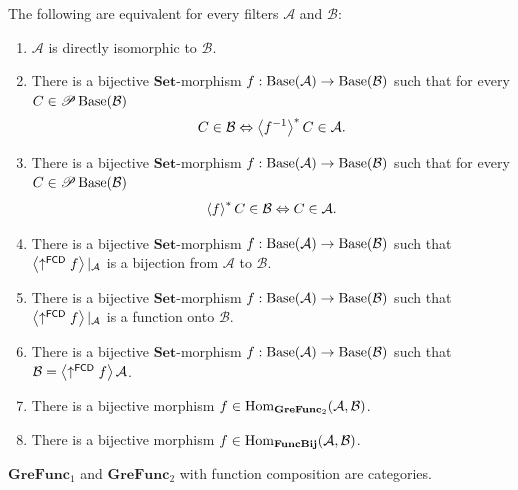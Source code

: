 \begin{cor}
The following are equivalent for every filters $\mathcal{A}$ and
$\mathcal{B}$:
\begin{enumerate}
\item $\mathcal{A}$ is directly isomorphic to $\mathcal{B}$.
\item There is a bijective $\mathbf{Set}$-morphism $f:\operatorname{Base}(\mathcal{A})\rightarrow\operatorname{Base}(\mathcal{B})$
such that for every $C\in\mathscr{P}\operatorname{Base}(\mathcal{B})$
\[
C\in\mathcal{B}\Leftrightarrow\left\langle f^{-1}\right\rangle ^{\ast}C\in\mathcal{A}.
\]

\item There is a bijective $\mathbf{Set}$-morphism $f:\operatorname{Base}(\mathcal{A})\rightarrow\operatorname{Base}(\mathcal{B})$
such that for every $C\in\mathscr{P}\operatorname{Base}(\mathcal{B})$
\[
\left\langle f\right\rangle ^{\ast}C\in\mathcal{B}\Leftrightarrow C\in\mathcal{A}.
\]

\item There is a bijective $\mathbf{Set}$-morphism $f:\operatorname{Base}(\mathcal{A})\rightarrow\operatorname{Base}(\mathcal{B})$
such that $\left\langle \uparrow^{\mathsf{FCD}}f\right\rangle|_{\mathcal{A}}$ is a
bijection from $\mathcal{A}$ to $\mathcal{B}$.
\item There is a bijective $\mathbf{Set}$-morphism $f:\operatorname{Base}(\mathcal{A})\rightarrow\operatorname{Base}(\mathcal{B})$
such that $\left\langle \uparrow^{\mathsf{FCD}}f\right\rangle|_{\mathcal{A}}$ is a
function onto $\mathcal{B}$.
\item There is a bijective $\mathbf{Set}$-morphism $f:\operatorname{Base}(\mathcal{A})\rightarrow\operatorname{Base}(\mathcal{B})$
such that $\mathcal{B}=\left\langle \uparrow^{\mathsf{FCD}}f\right\rangle\mathcal{A}$.
\item There is a bijective morphism $f\in\operatorname{Hom}_{\mathbf{GreFunc}_{2}}(\mathcal{A},\mathcal{B})$.
\item There is a bijective morphism $f\in\operatorname{Hom}_{\mathbf{FuncBij}}(\mathcal{A},\mathcal{B})$.
\end{enumerate}
\end{cor}
\begin{prop}
$\mathbf{GreFunc}_{1}$ and $\mathbf{GreFunc}_{2}$ with function
composition are categories.\end{prop}
